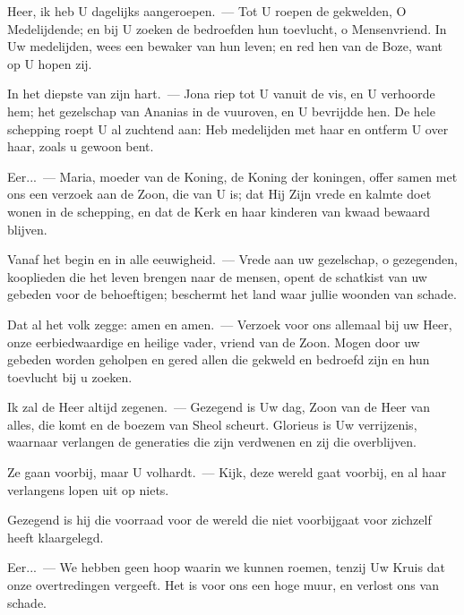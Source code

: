 \documentclass[12pt,twoside,a5paper]{article}
\begin{document}

\begin{halfparskip}
  Heer, ik heb U dagelijks aangeroepen.~--- Tot U roepen de gekwelden, O Medelijdende; en bij U zoeken de bedroefden hun toevlucht, o Mensenvriend. In Uw medelijden, wees een bewaker van hun leven; en red hen van de Boze, want op U hopen zij.

  In het diepste van zijn hart.~--- Jona riep tot U vanuit de vis, en U verhoorde hem; het gezelschap van Ananias in de vuuroven, en U bevrijdde hen. De hele schepping roept U al zuchtend aan: Heb medelijden met haar en ontferm U over haar, zoals u gewoon bent.

  Eer...~--- Maria, moeder van de Koning, de Koning der koningen, offer samen met ons een verzoek aan de Zoon, die van U is; dat Hij Zijn vrede en kalmte doet wonen in de schepping, en dat de Kerk en haar kinderen van kwaad bewaard blijven.

  Vanaf het begin en in alle eeuwigheid.~--- Vrede aan uw gezelschap, o gezegenden, kooplieden die het leven brengen naar de mensen, opent de schatkist van uw gebeden voor de behoeftigen; beschermt het land waar jullie woonden van schade.

  Dat al het volk zegge: amen en amen.~--- Verzoek voor ons allemaal bij uw Heer, onze eerbiedwaardige en heilige vader, vriend van de Zoon. Mogen door uw gebeden worden geholpen en gered allen die gekweld en bedroefd zijn en hun toevlucht bij u zoeken.
\end{halfparskip}


\begin{halfparskip}
  Ik zal de Heer altijd zegenen.~--- Gezegend is Uw dag, Zoon van de Heer van alles, die komt en de boezem van Sheol scheurt. Glorieus is Uw verrijzenis, waarnaar verlangen de generaties die zijn verdwenen en zij die overblijven.

  Ze gaan voorbij, maar U volhardt.~--- Kijk, deze wereld gaat voorbij, en al haar verlangens lopen uit op niets.

  Gezegend is hij die voorraad voor de wereld die niet voorbijgaat voor zichzelf heeft klaargelegd.

  Eer...~--- We hebben geen hoop waarin we kunnen roemen, tenzij Uw Kruis dat onze overtredingen vergeeft. Het is voor ons een hoge muur, en verlost ons van schade.
\end{halfparskip}
\end{document}
